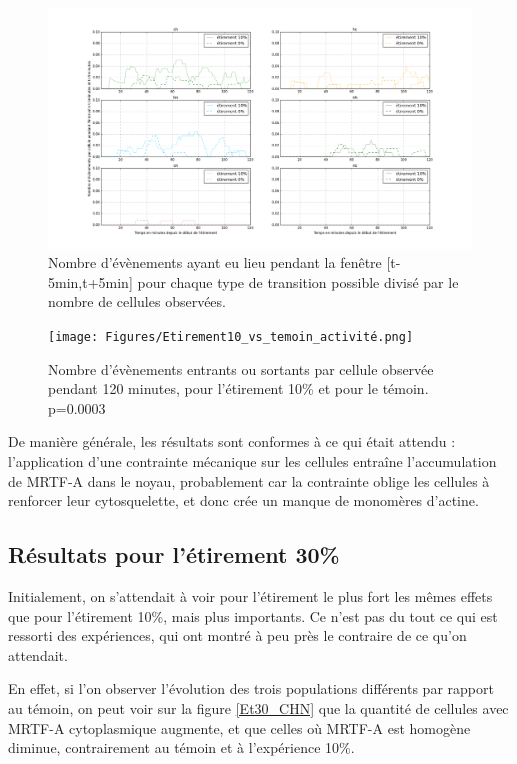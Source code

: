 \documentclass{report}
\begin{document}
\begin{figure}
\includegraphics[scale=0.33]{Figures/Etirement10_vs_0_translocations.png} 
\caption{\label{transloc_dyn_Et10} Nombre d'évènements ayant eu lieu pendant la fenêtre [t-5min,t+5min] pour chaque type de transition possible divisé par le nombre de cellules observées.}
\end{figure}

\begin{figure}
\texttt{[image: Figures/Etirement10\_vs\_temoin\_activité.png]} 
\caption{\label{activité_Et10} Nombre d'évènements entrants ou sortants par cellule observée pendant 120 minutes, pour l'étirement 10\% et pour le témoin. p=0.0003 }
\end{figure}

De manière générale, les résultats sont conformes à ce qui était attendu : l'application d'une contrainte mécanique sur les cellules entraîne l'accumulation de MRTF-A dans le noyau, probablement car la contrainte oblige les cellules à renforcer leur cytosquelette, et donc crée un manque de monomères d'actine.  


\subsection{Résultats pour l'étirement 30\%}

Initialement, on s'attendait à voir pour l'étirement le plus fort les mêmes effets que pour l'étirement 10\%, mais plus importants. 
Ce n'est pas du tout ce qui est ressorti des expériences, qui ont montré à peu près le contraire de ce qu'on attendait. 

En effet, si l'on observer l'évolution des trois populations différents par rapport au témoin, on peut voir sur la figure \ref{Et30_CHN} que la quantité de cellules avec MRTF-A cytoplasmique augmente, et que celles où MRTF-A est homogène diminue, contrairement au témoin et à l'expérience 10\%. 
\end{document}

